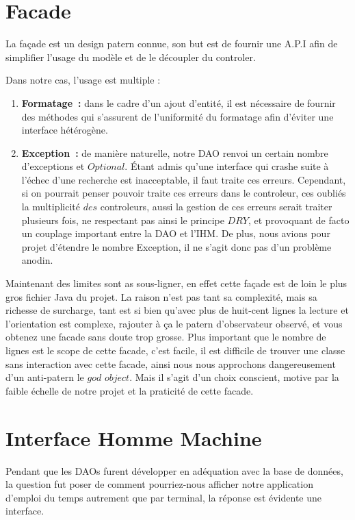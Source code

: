 \documentclass[a4paper,french,final]{memoir}
\begin{document}
\section{Facade}\label{section:facade}
La façade est un design patern connue, son but est de fournir une A.P.I afin de simplifier l'usage du modèle et de le découpler du controler.

Dans notre cas, l'usage est multiple :

\begin{enumerate}
    \item \textbf{Formatage :} dans le cadre d'un ajout d'entité, il est nécessaire de fournir des méthodes qui s'assurent de l'uniformité
    du formatage afin d'éviter une interface hétérogène.
    \item \textbf{Exception :} de manière naturelle, notre DAO renvoi un certain nombre d'exceptions et $Optional$. Étant admis qu'une interface
    qui crashe suite à l'échec d'une recherche est inacceptable, il faut traite ces erreurs. Cependant, si on pourrait penser pouvoir traite ces erreurs dans le controleur, ces oubliés la multiplicité $des$ controleurs, aussi la gestion de ces erreurs serait traiter plusieurs fois, ne respectant pas ainsi le principe $DRY$, et provoquant de facto un couplage important entre la DAO et l'IHM. De plus, nous avions pour projet
    d'étendre le nombre Exception, il ne s'agit donc pas d'un problème anodin.
\end{enumerate}

Maintenant des limites sont as sous-ligner, en effet cette façade est de loin le plus gros fichier Java du projet. La raison n'est pas tant
sa complexité, mais sa richesse de surcharge, tant est si bien qu'avec plus de huit-cent lignes la lecture et l'orientation est complexe, rajouter
à ça le patern d'observateur observé, et vous obtenez une facade sans doute trop grosse. Plus important que le nombre de lignes est le scope de
cette facade, c'est facile, il est difficile de trouver une classe sans interaction avec cette facade, ainsi nous nous approchons dangereusement
d'un anti-patern le $god$ $object$. Mais il s'agit d'un choix conscient, motive par la faible échelle de notre projet et la praticité de cette facade.

\section{Interface Homme Machine}
Pendant que les DAOs furent développer en adéquation avec la base de données, la question fut poser de comment pourriez-nous afficher notre application d'emploi du temps autrement que par terminal, la réponse est évidente une interface.
\end{document}
